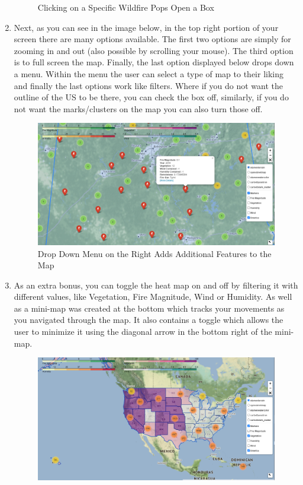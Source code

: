 \documentclass[fontsize=11pt]{article}
\begin{document}
\begin{enumerate}
\begin{figure}[h]
            \caption{Clicking on a Specific Wildfire Pops Open a Box}
            \label{fig:my_label}
        \end{figure}
    \item Next, as you can see in the image below, in the top right portion of your screen there are many options available. The first two options are simply for zooming in and out (also possible by scrolling your mouse). The third option is to full screen the map. Finally, the last option displayed below drops down a menu. Within the menu the user can select a type of map to their liking and finally the last options work like filters. Where if you do not want the outline of the US to be there, you can check the box off, similarly, if you do not want the marks/clusters on the map you can also turn those off. \\
    \begin{figure}[h]
            \centering
            \includegraphics[width = 16cm ]{zoom4.png}
            \caption{Drop Down Menu on the Right Adds Additional Features to the Map}
            \label{fig:my_label}
        \end{figure}
    \item As an extra bonus, you can toggle the heat map on and off by filtering it with different values, like Vegetation, Fire Magnitude, Wind or Humidity. As well as a mini-map was created at the bottom which tracks your movements as you navigated through the map. It also contains a toggle which allows the user to minimize it using the diagonal arrow in the bottom right of the mini-map. \\
    \begin{figure}[h]
            \centering
            \includegraphics[width = 13cm ]{bOnus.png}

\end{figure}
\end{enumerate}
\end{document}
